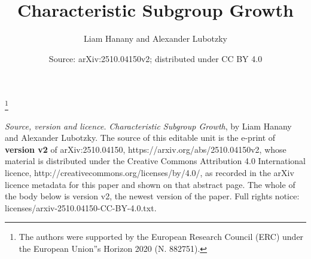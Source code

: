 \documentclass[10pt,a4paper]{amsart}
\begin{document}
\title{Characteristic Subgroup Growth}
\author{Liam Hanany and Alexander Lubotzky}
\thanks{The authors were supported by the European Research Council (ERC) under the European Union''s Horizon 2020 (N. 882751).}
\date{Source: arXiv:2510.04150v2; distributed under CC BY 4.0}
\maketitle
\noindent\emph{Source, version and licence.} \emph{Characteristic Subgroup Growth}, by Liam Hanany and Alexander Lubotzky. The source of this editable unit is the e-print of \textbf{version v2} of arXiv:2510.04150, https://arxiv.org/abs/2510.04150v2, whose material is distributed under the Creative Commons Attribution 4.0 International licence, http://creativecommons.org/licenses/by/4.0/, as recorded in the arXiv licence metadata for this paper and shown on that abstract page. The whole of the body below is version v2, the newest version of the paper. Full rights notice: licenses/arxiv-2510.04150-CC-BY-4.0.txt.\par\smallskip
\end{document}
